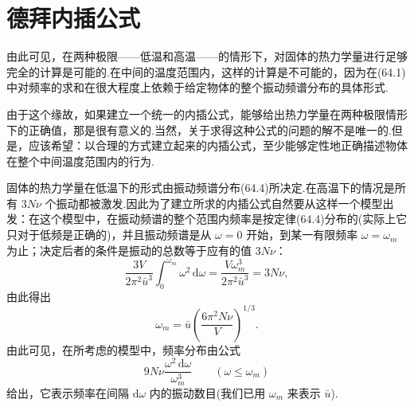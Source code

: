 \section{德拜内插公式}

由此可见，在两种极限——低温和高温——的情形下，对固体的热力学量进行足够完全的计算是可能的.在中间的温度范围内，这样的计算是不可能的，因为在(64.1)中对频率的求和在很大程度上依赖于给定物体的整个振动频谱分布的具体形式.

由于这个缘故，如果建立一个统一的内插公式，能够给出热力学量在两种极限情形下的正确值，那是很有意义的.当然，关于求得这种公式的问题的解不是唯一的.但是，应该希望：以合理的方式建立起来的内插公式，至少能够定性地正确描述物体在整个中间温度范围内的行为.

固体的热力学量在低温下的形式由振动频谱分布(64.4)所决定.在高温下的情况是所有 $3N\nu$ 个振动都被激发.因此为了建立所求的内插公式自然要从这样一个模型出发：在这个模型中，在振动频谱的整个范围内频率是按定律(64.4)分布的(实际上它只对于低频是正确的)，并且振动频谱是从 $\omega=0$ 开始，到某一有限频率 $\omega=\omega_m$ 为止；决定后者的条件是振动的总数等于应有的值 $3N\nu$：
\begin{equation*}
  \frac{3V}{2\pi^2\bar{u}^3}\int_0^{\omega_m}\omega^2\,\mathrm{d}\omega=\frac{V\omega_m^3}{2\pi^2\bar{u}^3}=3N\nu,
\end{equation*}
由此得出
\begin{equation}
  \omega_m=\bar{u}\left(\frac{6\pi^2N\nu}{V}\right)^{1/3}.
\end{equation}
由此可见，在所考虑的模型中，频率分布由公式
\begin{equation}
  9N\nu\frac{\omega^2\,\mathrm{d}\omega}{\omega_m^3}\qquad(\omega\leqslant\omega_m)
\end{equation}
给出，它表示频率在间隔 $\mathrm{d}\omega$ 内的振动数目(我们已用 $\omega_m$ 来表示 $\bar{u}$).


